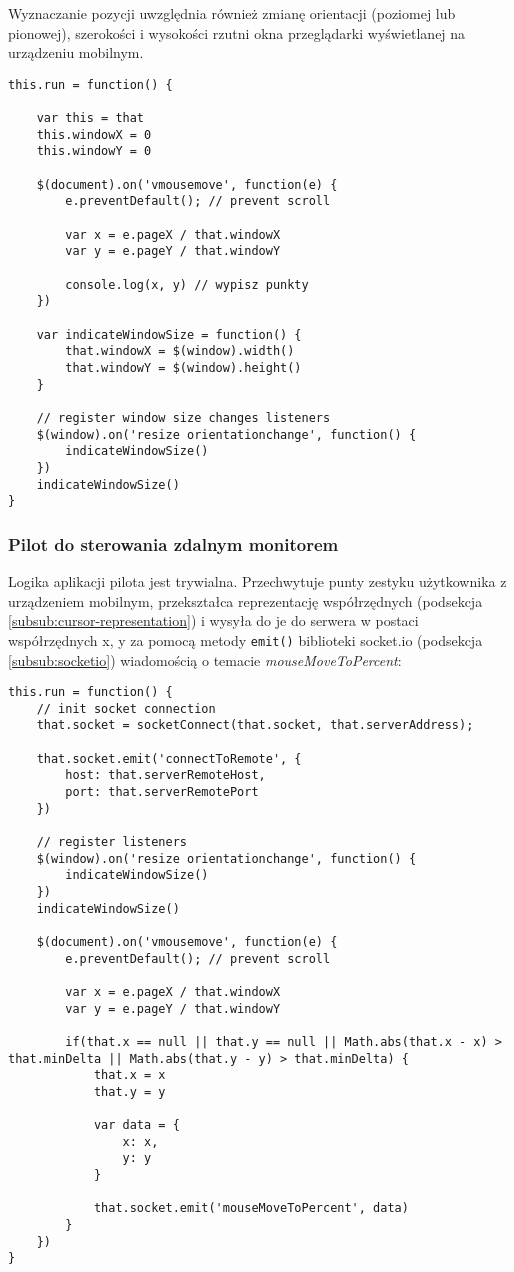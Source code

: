 Wyznaczanie pozycji uwzględnia również zmianę orientacji (poziomej lub pionowej), szerokości i wysokości rzutni okna przeglądarki wyświetlanej na urządzeniu mobilnym.

\lstset{language=JavaScript}
\begin{lstlisting}
this.run = function() {
	
	var this = that
	this.windowX = 0
	this.windowY = 0
	
	$(document).on('vmousemove', function(e) {
		e.preventDefault(); // prevent scroll
		
		var x = e.pageX / that.windowX
		var y = e.pageY / that.windowY
		
		console.log(x, y) // wypisz punkty
	})
	
	var indicateWindowSize = function() {
		that.windowX = $(window).width()
		that.windowY = $(window).height()
	}
	
	// register window size changes listeners
	$(window).on('resize orientationchange', function() {
		indicateWindowSize()
	})
	indicateWindowSize()
}
\end{lstlisting}

\subsubsection{Pilot do sterowania zdalnym monitorem}

Logika aplikacji pilota jest trywialna. Przechwytuje punty zestyku użytkownika z urządzeniem mobilnym, przekształca reprezentację współrzędnych (podsekcja \ref{subsub:cursor-representation}) i wysyła do je do serwera w postaci współrzędnych x, y za pomocą metody \lstinline{emit()} biblioteki socket.io (podsekcja \ref{subsub:socketio}) wiadomością o temacie \emph{mouseMoveToPercent}:

\lstset{language=JavaScript}
\begin{lstlisting}
this.run = function() {
	// init socket connection
	that.socket = socketConnect(that.socket, that.serverAddress);
	
	that.socket.emit('connectToRemote', {
		host: that.serverRemoteHost,
		port: that.serverRemotePort
	})
	
	// register listeners
	$(window).on('resize orientationchange', function() {
		indicateWindowSize()
	})
	indicateWindowSize()
	
	$(document).on('vmousemove', function(e) {
		e.preventDefault(); // prevent scroll
		
		var x = e.pageX / that.windowX
		var y = e.pageY / that.windowY
		
		if(that.x == null || that.y == null || Math.abs(that.x - x) > that.minDelta || Math.abs(that.y - y) > that.minDelta) {
			that.x = x
			that.y = y
			
			var data = {
				x: x,
				y: y
			}
			
			that.socket.emit('mouseMoveToPercent', data)
		}
	})
}
\end{lstlisting}

